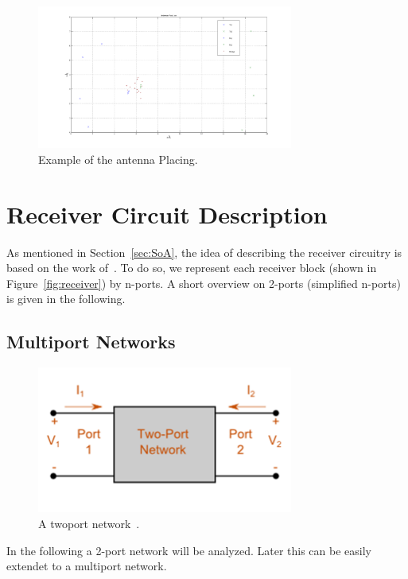 \begin{figure}[h]
\begin{center}
\includegraphics[width=0.75\textwidth]{images/antennae_position.png}
\caption{Example of the antenna Placing.}
\label{fig:antenna_placing}
\end{center}
\end{figure}

\section{Receiver Circuit Description}
\label{sec:network_description}
As mentioned in Section~\ref{sec:SoA}, the idea of describing the receiver circuitry is based on the work of~\cite{Nossek}.
To do so, we represent each receiver block (shown in Figure~\ref{fig:receiver}) by n-ports.
A short overview on 2-ports (simplified n-ports) is given in the following.

\subsection{Multiport Networks}
\label{sec:multiport_networks}

\begin{figure}[h]
\begin{center}
\includegraphics[width=0.75\textwidth]{images/twoport.png}
\caption{A twoport network~\cite{magnus:twoport}.}
\label{fig:twoport}
\end{center}
\end{figure}
In the following a 2-port network will be analyzed.
Later this can be easily extendet to a multiport network.

